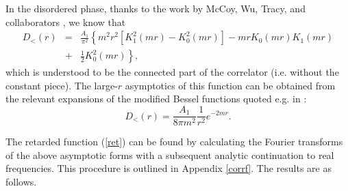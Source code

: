 In the disordered phase, thanks to
the work by McCoy, Wu, Tracy, and collaborators \cite{MC},
we know that
\begin{eqnarray}
D_<(r)&=&\frac{A_1}{\pi^2}\left\{
m^2r^2\left[K_1^2(mr)-K_0^2(mr)\right]-mrK_0(mr)K_1(mr)
\nonumber\right.\\&+&\left.
\frac{1}{2}K_0^2(mr)\right\},
\label{Ddis}
\end{eqnarray}
which is understood to be the connected part of the
correlator
(i.e. without the constant piece). The large-$r$
asymptotics
of this function can be obtained from the relevant expansions
of the modified Bessel functions quoted e.g. in \cite{GNT}:
\begin{equation}
D_<(r)=\frac{A_1}{8\pi m^2}
\frac{1}{r^2}e^{-2mr}.
\label{Ddisas}
\end{equation}

The retarded function (\ref{ret}) can be
found by calculating the Fourier transforms of
the above asymptotic forms with a subsequent
analytic continuation to real frequencies.
This procedure is outlined in Appendix \ref{corrf}.
The results are as follows.

